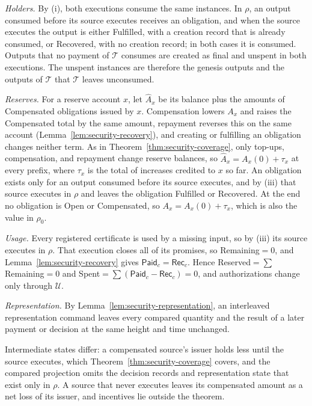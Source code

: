 \begin{IEEEproof}
\emph{Holders.} By (i), both executions consume the same instances. In $\rho$, an output consumed before its source executes receives an obligation, and when the source executes the output is either Fulfilled, with a creation record that is already consumed, or Recovered, with no creation record; in both cases it is consumed. Outputs that no payment of $\mathcal T$ consumes are created as final and unspent in both executions. The unspent instances are therefore the genesis outputs and the outputs of $\mathcal T$ that $\mathcal T$ leaves unconsumed.

\emph{Reserves.} For a reserve account $x$, let $\hat A_x$ be its balance plus the amounts of Compensated obligations issued by $x$. Compensation lowers $A_x$ and raises the Compensated total by the same amount, repayment reverses this on the same account (Lemma~\ref{lem:security-recovery}), and creating or fulfilling an obligation changes neither term. As in Theorem~\ref{thm:security-coverage}, only top-ups, compensation, and repayment change reserve balances, so $\hat A_x=A_x(0)+\tau_x$ at every prefix, where $\tau_x$ is the total of increases credited to $x$ so far. An obligation exists only for an output consumed before its source executes, and by (iii) that source executes in $\rho$ and leaves the obligation Fulfilled or Recovered. At the end no obligation is Open or Compensated, so $A_x=A_x(0)+\tau_x$, which is also the value in $\rho_0$.

\emph{Usage.} Every registered certificate is used by a missing input, so by (iii) its source executes in $\rho$. That execution closes all of its promises, so Remaining$=0$, and Lemma~\ref{lem:security-recovery} gives $\mathsf{Paid}_c=\mathsf{Rec}_c$. Hence Reserved$=\sum$Remaining$=0$ and Spent$=\sum(\mathsf{Paid}_c-\mathsf{Rec}_c)=0$, and authorizations change only through $\mathcal U$.

\emph{Representation.} By Lemma~\ref{lem:security-representation}, an interleaved representation command leaves every compared quantity and the result of a later payment or decision at the same height and time unchanged.
\end{IEEEproof}

Intermediate states differ: a compensated source's issuer holds less until the source executes, which Theorem~\ref{thm:security-coverage} covers, and the compared projection omits the decision records and representation state that exist only in $\rho$. A source that never executes leaves its compensated amount as a net loss of its issuer, and incentives lie outside the theorem.

